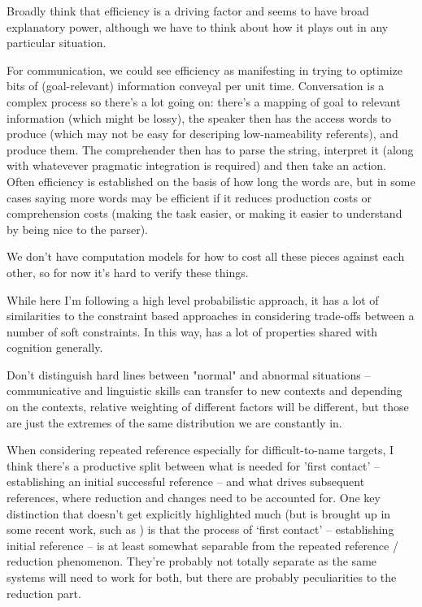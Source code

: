 \documentclass[]{article}
\begin{document}
Broadly think that efficiency is a driving factor and seems to have broad explanatory power, although we have to think about how it plays out in any particular situation. 

For communication, we could see efficiency as manifesting in trying to optimize bits of (goal-relevant) information conveyal per unit time. Conversation is a complex process so there's a lot going on: there's a mapping of goal to relevant information (which might be lossy), the speaker then has the access words to produce (which may not be easy for descriping low-nameability referents), and produce them. The comprehender then has to parse the string, interpret it (along with whatevever pragmatic integration is required) and then take an action. Often efficiency is established on the basis of how long the words are, but in some cases saying more words may be efficient if it reduces production costs or comprehension costs (making the task easier, or making it easier to understand by being nice to the parser). 

We don't have computation models for how to cost all these pieces against each other, so for now it's hard to verify these things. 

While here I'm following a high level probabilistic approach, it has a lot of similarities to the constraint based approaches in considering trade-offs between a number of soft constraints. In this way, has a lot of properties shared with cognition generally. 

Don't distinguish hard lines between "normal" and abnormal situations -- communicative and linguistic skills can transfer to new contexts and depending on the contexts, relative weighting of different factors will be different, but those are just the extremes of the same distribution we are constantly in. 

When considering repeated reference especially for difficult-to-name targets, I think there's a productive split between what is needed for 'first contact' -- establishing an initial successful reference -- and what drives subsequent references, where reduction and changes need to be accounted for. One key distinction that doesn't get explicitly highlighted much (but is brought up in some recent work, such as \cite{leung2023}) is that the process of `first contact' -- establishing initial reference -- is at least somewhat separable from the repeated reference / reduction phenomenon. They're probably not totally separate as the same systems will need to work for both, but there are probably peculiarities to the reduction part. 
\end{document}
